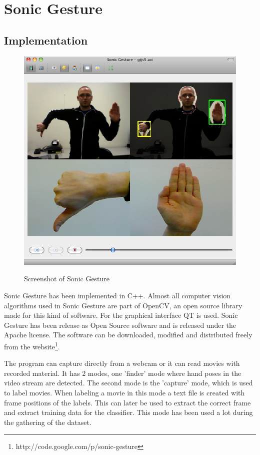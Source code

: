 
\chapter{Sonic Gesture}
\label{ch:sonicgesture}

\section{Implementation}
\label{sec:implementation}

\begin{figure}[ht]
\begin{center}
\label{fig:sonicgesture}
\includegraphics[width=0.6\linewidth]{figures/sonicgesture.jpg}
\end{center}
\caption{Screenshot of Sonic Gesture}
\end{figure}

Sonic Gesture has been implemented in C++. Almost all computer vision algorithms used in Sonic Gesture are part of OpenCV, an open source library made for this kind of software. For the graphical interface QT is used. Sonic Gesture has been release as Open Source software and is released under the Apache license. The software can be downloaded, modified and distributed freely from the website\footnote{http://code.google.com/p/sonic-gesture}.

The program can capture directly from a webcam or it can read movies with recorded material. It has 2 modes, one 'finder' mode where hand poses in the video stream are detected. The second mode is the 'capture' mode, which is used to label movies. When labeling a movie in this mode a text file is created with frame positions of the labels. This can later be used to extract the correct frame and extract training data for the classifier. This mode has been used a lot during the gathering of the dataset.


